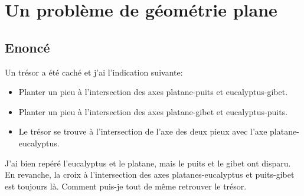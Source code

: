 \documentclass{article}
\begin{document}
\section{Un problème de géométrie plane}

\subsection{Enoncé}
Un trésor a été caché et j'ai l'indication suivante:
\begin{itemize}
\item
Planter un pieu à l'intersection des axes platane-puits et eucalyptus-gibet.
\item
Planter un pieu à l'intersection des axes platane-gibet et eucalyptus-puits.
\item
Le trésor se trouve à l'intersection de l'axe des deux pieux avec l'axe platane-eucalyptus.
\end{itemize}
J'ai bien repéré l'eucalyptus et le platane, mais le puits et le gibet ont disparu. En revanche, la croix à l'intersection des axes platanes-eucalyptus et puits-gibet est toujours là. Comment puis-je tout de même retrouver le trésor.
\end{document}
